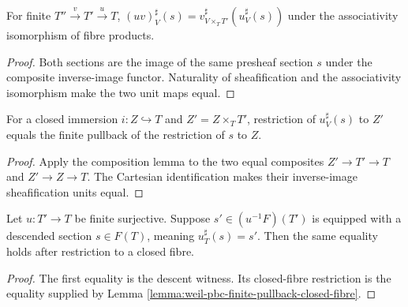 \begin{lemma}
\label{lemma:weil-pbc-finite-pullback-composition}
For finite $T''\xrightarrow{v}T'\xrightarrow{u}T$,
$(uv)_V^\sharp(s)=v_{V\times_TT'}^\sharp(u_V^\sharp(s))$ under the
associativity isomorphism of fibre products.
\end{lemma}
\begin{proof}

Both sections are the image of the same presheaf section $s$ under the
composite inverse-image functor.  Naturality of sheafification and the
associativity isomorphism make the two unit maps equal.
\end{proof}

\begin{lemma}
\label{lemma:weil-pbc-finite-pullback-closed-fibre}
For a closed immersion $i:Z\hookrightarrow T$ and
$Z'=Z\times_TT'$, restriction of $u_V^\sharp(s)$ to $Z'$ equals the finite
pullback of the restriction of $s$ to $Z$.
\end{lemma}
\begin{proof}

Apply the composition lemma to the two equal composites
$Z'\to T'\to T$ and $Z'\to Z\to T$.  The Cartesian identification makes
their inverse-image sheafification units equal.
\end{proof}

\begin{lemma}
\label{lemma:weil-pbc-finite-pullback-descent}
Let $u:T'\to T$ be finite surjective.  Suppose $s'\in(u^{-1}F)(T')$ is
equipped with a descended section $s\in F(T)$, meaning
$u_T^\sharp(s)=s'$.  Then the same equality holds after restriction to a
closed fibre.
\end{lemma}
\begin{proof}

The first equality is the descent witness.  Its closed-fibre restriction is
the equality supplied by Lemma
\ref{lemma:weil-pbc-finite-pullback-closed-fibre}.
\end{proof}

